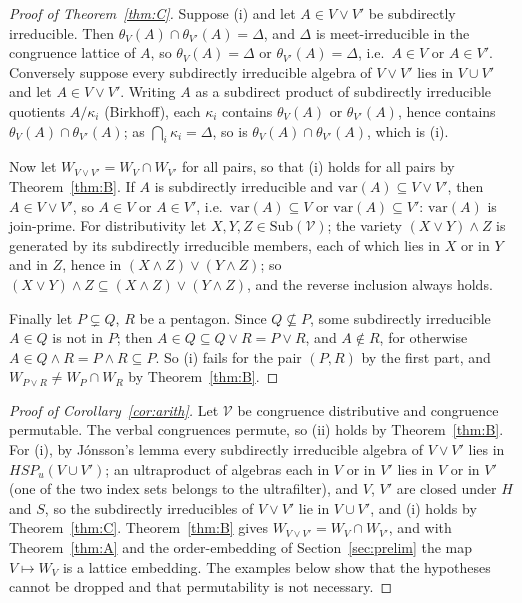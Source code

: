 \documentclass[11pt]{amsart}
\theoremstyle{definition}
\newcommand{\Sub}{\mathrm{Sub}}
\newcommand{\sV}{\mathcal V}
\newcommand{\var}{\mathrm{var}}
\begin{document}
\begin{proof}[Proof of Theorem~\ref{thm:C}]
Suppose (i) and let $A\in V\vee V'$ be subdirectly irreducible. Then
$\theta_V(A)\cap\theta_{V'}(A)=\Delta$, and $\Delta$ is meet-irreducible in
the congruence lattice of $A$, so $\theta_V(A)=\Delta$ or
$\theta_{V'}(A)=\Delta$, i.e.\ $A\in V$ or $A\in V'$. Conversely suppose every
subdirectly irreducible algebra of $V\vee V'$ lies in $V\cup V'$ and let
$A\in V\vee V'$. Writing $A$ as a subdirect product of subdirectly irreducible
quotients $A/\kappa_i$ (Birkhoff), each $\kappa_i$ contains $\theta_V(A)$ or
$\theta_{V'}(A)$, hence contains $\theta_V(A)\cap\theta_{V'}(A)$; as
$\bigcap_i\kappa_i=\Delta$, so is $\theta_V(A)\cap\theta_{V'}(A)$, which is (i).

Now let $W_{V\vee V'}=W_V\cap W_{V'}$ for all pairs, so that (i) holds for all
pairs by Theorem~\ref{thm:B}. If $A$ is subdirectly irreducible and
$\var(A)\subseteq V\vee V'$, then $A\in V\vee V'$, so $A\in V$ or $A\in V'$,
i.e.\ $\var(A)\subseteq V$ or $\var(A)\subseteq V'$: $\var(A)$ is join-prime.
For distributivity let $X,Y,Z\in\Sub(\sV)$; the variety $(X\vee Y)\wedge Z$ is
generated by its subdirectly irreducible members, each of which lies in $X$ or
in $Y$ and in $Z$, hence in $(X\wedge Z)\vee(Y\wedge Z)$; so
$(X\vee Y)\wedge Z\subseteq(X\wedge Z)\vee(Y\wedge Z)$, and the reverse
inclusion always holds.

Finally let $P\subsetneq Q$, $R$ be a pentagon. Since $Q\not\subseteq P$,
some subdirectly irreducible $A\in Q$ is not in $P$; then
$A\in Q\subseteq Q\vee R=P\vee R$, and $A\notin R$, for otherwise
$A\in Q\wedge R=P\wedge R\subseteq P$. So (i) fails for the pair $(P,R)$ by
the first part, and $W_{P\vee R}\ne W_P\cap W_R$ by Theorem~\ref{thm:B}.
\end{proof}

\begin{proof}[Proof of Corollary~\ref{cor:arith}]
Let $\sV$ be congruence distributive and congruence permutable. The verbal
congruences permute, so (ii) holds by Theorem~\ref{thm:B}. For (i), by
Jónsson's lemma \cite{Jonsson} every subdirectly irreducible algebra of
$V\vee V'$ lies in $HSP_u(V\cup V')$; an ultraproduct of algebras each in $V$
or in $V'$ lies in $V$ or in $V'$ (one of the two index sets belongs to the
ultrafilter), and $V$, $V'$ are closed under $H$ and $S$, so the subdirectly
irreducibles of $V\vee V'$ lie in $V\cup V'$, and (i) holds by
Theorem~\ref{thm:C}. Theorem~\ref{thm:B} gives
$W_{V\vee V'}=W_V\cap W_{V'}$, and with Theorem~\ref{thm:A} and the
order-embedding of Section~\ref{sec:prelim} the map $V\mapsto W_V$ is a lattice
embedding. The examples below show that the hypotheses cannot be dropped and
that permutability is not necessary.
\end{proof}
\end{document}
